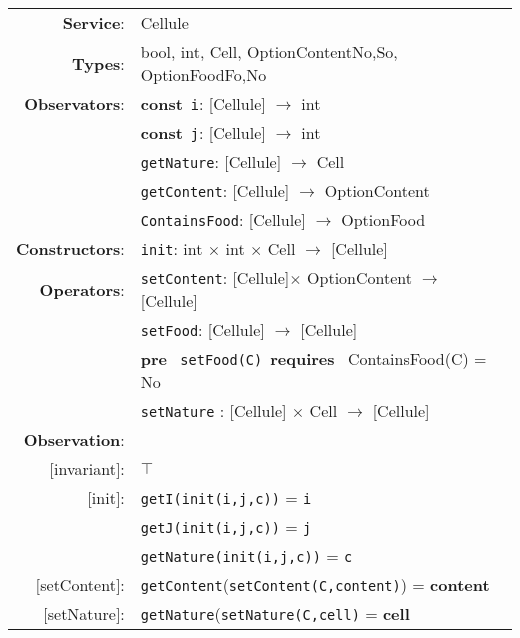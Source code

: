 \begin{tabular}{rl}
\textbf{Service}: & \textrm{Cellule}  \\
\textbf{Types}: & \textrm{bool}, \textrm{int}, \textrm{Cell}, OptionContent{No,So}, OptionFood{Fo,No}  \\
\textbf{Observators}: & \textbf{const}~\texttt{i}: \textrm{[Cellule]} $\rightarrow$ \textrm{int} \\

& \textbf{const}~\texttt{j}: \textrm{[Cellule]} $\rightarrow$ \textrm{int} \\
& \texttt{getNature}: \textrm{[Cellule]} $\rightarrow$ \textrm{Cell} \\
& \texttt{getContent}: \textrm{[Cellule]} $\rightarrow$ \textrm{OptionContent} \\
& \texttt{ContainsFood}:
\textrm{[Cellule]} $\rightarrow$ \textrm{OptionFood} \\

\textbf{Constructors}: & \texttt{init}: \textrm{int} $\times$ \textrm{int} $\times$ \textrm{Cell} $\rightarrow$ \textrm{[Cellule]} \\
\textbf{Operators}: & \texttt{setContent}: \textrm{[Cellule]}$\times$ \textrm{OptionContent} $\rightarrow$ \textrm{[Cellule]} \\
&\texttt{setFood}: \textrm{[Cellule]} $\rightarrow$ \textrm{[Cellule]} \\
& \quad\quad \textbf{pre}~ \texttt{setFood(C)}~\textbf{requires}~ ContainsFood(C) = No\\
& \texttt{setNature} : \textrm{[Cellule]} $\times$ \textrm{Cell} $\rightarrow$ \textrm{[Cellule]} \\  

       \textbf{Observation}: \\
       $[$invariant$]$: & $\top$ \\
       $[$init$]$: & \texttt{getI(init(i,j,c))} = \texttt{i} \\
       & \texttt{getJ(init(i,j,c))} = \texttt{j}\\
       & \texttt{getNature(init(i,j,c))} = \texttt{c}\\ 
       $[$setContent$]$: & \texttt{getContent}(\texttt{setContent(C,content)}) = \textbf{content} \\
$[$setNature$]$: & \texttt{getNature}(\texttt{setNature(C,cell)} = \textbf{cell} \\
\end{tabular}